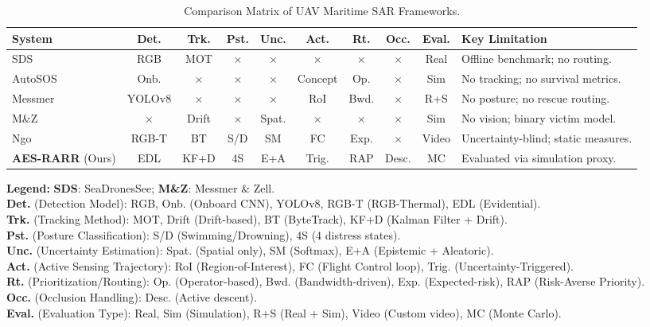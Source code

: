 \documentclass[11pt,a4paper]{article}
\begin{document}
\begin{table}[t!]
\centering
\caption{Comparison Matrix of UAV Maritime SAR Frameworks.}
\label{tab:comparison}
\small
\setlength{\tabcolsep}{3.5pt}
\renewcommand{\arraystretch}{1.1}
\begin{tabularx}{\textwidth}{@{} L{1.0} C{0.7} C{0.7} C{0.6} C{0.8} C{0.7} C{0.8} C{0.6} C{0.7} L{3.4} @{}}
\toprule
\textbf{System} & \textbf{Det.} & \textbf{Trk.} & \textbf{Pst.} & \textbf{Unc.} & \textbf{Act.} & \textbf{Rt.} & \textbf{Occ.} & \textbf{Eval.} & \textbf{Key Limitation} \\
\midrule
SDS~\cite{ref3} 
  & RGB 
  & MOT 
  & $\times$ 
  & $\times$ 
  & $\times$ 
  & $\times$ 
  & $\times$ 
  & Real 
  & Offline benchmark; no routing. \\
\addlinespace
AutoSOS~\cite{ref11} 
  & Onb. 
  & $\times$ 
  & $\times$ 
  & $\times$ 
  & Concept 
  & Op. 
  & $\times$ 
  & Sim 
  & No tracking; no survival metrics. \\
\addlinespace
Messmer~\cite{ref5} 
  & YOLOv8 
  & $\times$ 
  & $\times$ 
  & $\times$ 
  & RoI 
  & Bwd. 
  & $\times$ 
  & R+S 
  & No posture; no rescue routing. \\
\addlinespace
M\&Z~\cite{ref12} 
  & $\times$ 
  & Drift 
  & $\times$ 
  & Spat. 
  & $\times$ 
  & $\times$ 
  & $\times$ 
  & Sim 
  & No vision; binary victim model. \\
\addlinespace
Ngo~\cite{ref4} 
  & RGB-T 
  & BT 
  & S/D 
  & SM 
  & FC 
  & Exp. 
  & $\times$ 
  & Video 
  & Uncertainty-blind; static measures. \\
\midrule
\textbf{AES-RARR} (Ours) 
  & EDL 
  & KF+D 
  & 4S 
  & E+A 
  & Trig. 
  & RAP 
  & Desc. 
  & MC 
  & Evaluated via simulation proxy. \\
\bottomrule
\end{tabularx}
\smallskip
\scriptsize
\textbf{Legend:} 
\textbf{SDS}: SeaDronesSee; \textbf{M\&Z}: Messmer \& Zell. \\
\textbf{Det.} (Detection Model): RGB, Onb. (Onboard CNN), YOLOv8, RGB-T (RGB-Thermal), EDL (Evidential). \\
\textbf{Trk.} (Tracking Method): MOT, Drift (Drift-based), BT (ByteTrack), KF+D (Kalman Filter + Drift). \\
\textbf{Pst.} (Posture Classification): S/D (Swimming/Drowning), 4S (4 distress states). \\
\textbf{Unc.} (Uncertainty Estimation): Spat. (Spatial only), SM (Softmax), E+A (Epistemic + Aleatoric). \\
\textbf{Act.} (Active Sensing Trajectory): RoI (Region-of-Interest), FC (Flight Control loop), Trig. (Uncertainty-Triggered). \\
\textbf{Rt.} (Prioritization/Routing): Op. (Operator-based), Bwd. (Bandwidth-driven), Exp. (Expected-risk), RAP (Risk-Averse Priority). \\
\textbf{Occ.} (Occlusion Handling): Desc. (Active descent). \\
\textbf{Eval.} (Evaluation Type): Real, Sim (Simulation), R+S (Real + Sim), Video (Custom video), MC (Monte Carlo).
\end{table}
\end{document}
